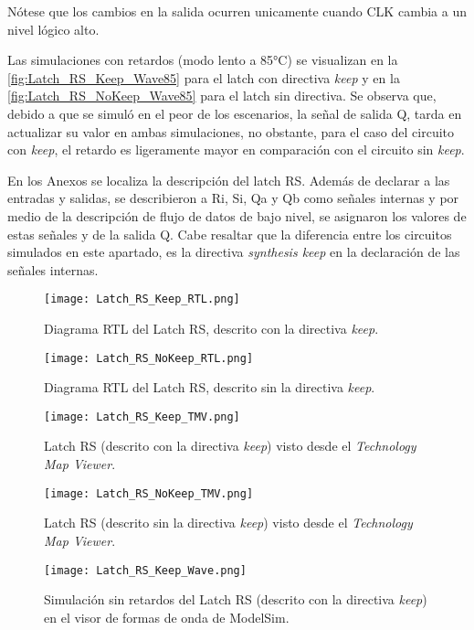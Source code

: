 Nótese que los cambios en la salida ocurren unicamente cuando CLK cambia a un nivel lógico alto.

Las simulaciones con retardos (modo lento a 85°C) se visualizan en la \autoref{fig:Latch_RS_Keep_Wave85} para el latch con directiva \textit{keep} y en la \autoref{fig:Latch_RS_NoKeep_Wave85} para el latch sin directiva. Se observa que, debido a que se simuló en el peor de los escenarios, la señal de salida Q, tarda en actualizar su valor en ambas simulaciones, no obstante, para el caso del circuito con \textit{keep}, el retardo es ligeramente mayor en comparación con el circuito sin \textit{keep}.

En los Anexos se localiza la descripción del latch RS. Además de declarar a las entradas y salidas, se describieron a Ri, Si, Qa y Qb como señales internas y por medio de la descripción de flujo de datos de bajo nivel, se asignaron los valores de estas señales y de la salida Q. Cabe resaltar que la diferencia entre los circuitos simulados en este apartado, es la directiva \textit{synthesis keep} en la declaración de las señales internas.

\begin{figure}[ht]
	\centering
	\texttt{[image: Latch\_RS\_Keep\_RTL.png]}
	\caption{Diagrama RTL del Latch RS, descrito con la directiva \textit{keep}. \label{fig:Latch_RS_Keep_RTL}}
\end{figure}

\begin{figure}[ht]
	\centering
	\texttt{[image: Latch\_RS\_NoKeep\_RTL.png]}
	\caption{Diagrama RTL del Latch RS, descrito sin la directiva \textit{keep}. \label{fig:Latch_RS_NoKeep_RTL}}
\end{figure}

\begin{figure}[ht]
	\centering
	\texttt{[image: Latch\_RS\_Keep\_TMV.png]}
	\caption{Latch RS (descrito con la directiva \textit{keep}) visto desde el \textit{Technology Map Viewer}. \label{fig:Latch_RS_Keep_TMV}}
\end{figure}

\begin{figure}[ht]
	\centering
	\texttt{[image: Latch\_RS\_NoKeep\_TMV.png]}
	\caption{Latch RS (descrito sin la directiva \textit{keep}) visto desde el \textit{Technology Map Viewer}. \label{fig:Latch_RS_NoKeep_TMV}}
\end{figure}

\begin{figure}[ht]
	\centering
	\texttt{[image: Latch\_RS\_Keep\_Wave.png]}
	\caption{Simulación sin retardos del Latch RS (descrito con la directiva \textit{keep}) en el visor de formas de onda de ModelSim. \label{fig:Latch_RS_Keep_Wave}}
\end{figure}

